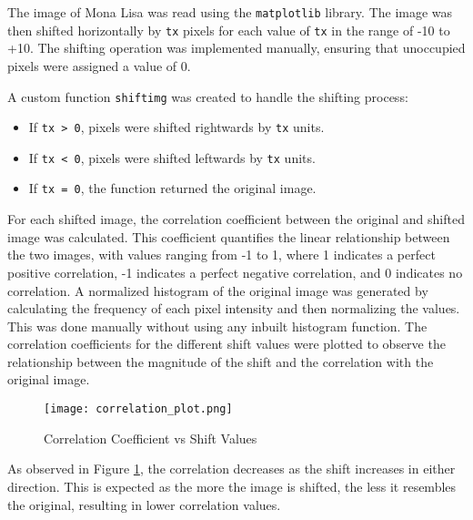 \begin{tcolorbox}
    \begin{sol}        
        The image of Mona Lisa was read using the \texttt{matplotlib} library. The image was then shifted horizontally by \texttt{tx} pixels for each value of \texttt{tx} in the range of -10 to +10. The shifting operation was implemented manually, ensuring that unoccupied pixels were assigned a value of 0.
        
        A custom function \texttt{shiftimg} was created to handle the shifting process:
        \begin{itemize}
            \item If \texttt{tx > 0}, pixels were shifted rightwards by \texttt{tx} units.
            \item If \texttt{tx < 0}, pixels were shifted leftwards by \texttt{tx} units.
            \item If \texttt{tx = 0}, the function returned the original image.
        \end{itemize}
        
        For each shifted image, the correlation coefficient between the original and shifted image was calculated. This coefficient quantifies the linear relationship between the two images, with values ranging from -1 to 1, where 1 indicates a perfect positive correlation, -1 indicates a perfect negative correlation, and 0 indicates no correlation.
        A normalized histogram of the original image was generated by calculating the frequency of each pixel intensity and then normalizing the values. This was done manually without using any inbuilt histogram function.
        \newpage
        The correlation coefficients for the different shift values were plotted to observe the relationship between the magnitude of the shift and the correlation with the original image.
        
        \begin{figure}[H]
            \centering
            \texttt{[image: correlation\_plot.png]}
            \caption{Correlation Coefficient vs Shift Values}
            \label{fig:corr_plot}
        \end{figure}
        
        
        As observed in Figure \ref{fig:corr_plot}, the correlation decreases as the shift increases in either direction. This is expected as the more the image is shifted, the less it resembles the original, resulting in lower correlation values.
        

\end{sol}
\end{tcolorbox}
